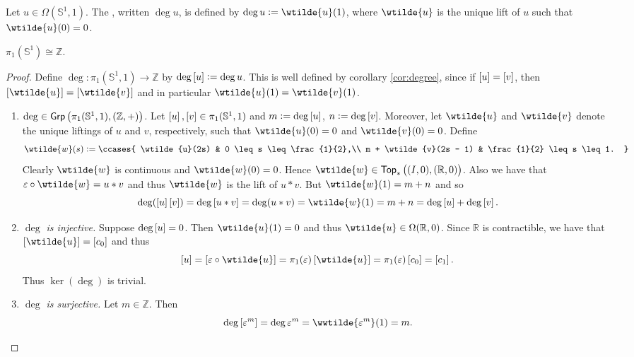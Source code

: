 \begin{definition}[Degree]
	Let $u \in \Omega(\mathbb{S}^1,1)$. The , written $\deg u$, is defined by $\deg u := \wtilde{u}(1)$, where $\wtilde{u}$ is the unique lift of $u$ such that $\wtilde{u}(0) = 0$. 
\end{definition}

\begin{theorem}
	$\pi_1(\mathbb{S}^1) \cong \mathbb{Z}$.
\end{theorem}

\begin{proof}
	Define $\deg : \pi_1(\mathbb{S}^1,1) \to \mathbb{Z}$ by $\deg \sbr{u} := \deg u$. This is well defined by corollary \ref{cor:degree}, since if $\sbr{u} = \sbr{v}$, then $\sbr[0]{\wtilde{u}} = \sbr[0]{\wtilde{v}}$ and in particular $\wtilde{u}(1) = \wtilde{v}(1)$. 
	\begin{enumerate}[label = \textit{Step \arabic*:},wide = 0pt, itemsep = 1.5ex]
		\item \textit{$\deg \in \mathsf{Grp}\del[1]{\pi_1(\mathbb{S}^1,1),(\mathbb{Z},+)}$.} Let $\sbr{u},\sbr{v} \in \pi_1(\mathbb{S}^1,1)$ and $m := \deg\sbr{u}$, $n := \deg \sbr{v}$. Moreover, let $\wtilde{u}$ and $\wtilde{v}$ denote the unique liftings of $u$ and $v$, respectively, such that $\wtilde{u}(0) = 0$ and $\wtilde{v}(0) = 0$. Define
			\begin{equation*}
				\wtilde{w}(s) := \ccases{
				\wtilde{u}(2s) & 0 \leq s \leq \frac{1}{2},\\
				m + \wtilde{v}(2s - 1) & \frac{1}{2} \leq s \leq 1.
			}
			\end{equation*}
		Clearly $\wtilde{w}$ is continuous and $\wtilde{w}(0) = 0$. Hence $\wtilde{w} \in \mathsf{Top}_\ast\del[1]{(I,0),(\mathbb{R},0)}$. Also we have that $\varepsilon \circ \wtilde{w} = u \ast v$ and thus $\wtilde{w}$ is the lift of $u \ast v$. But $\wtilde{w}(1) = m + n$ and so
			\begin{equation*}
				\deg(\sbr{u}\sbr{v}) = \deg\sbr{u\ast v} = \deg (u \ast v) = \wtilde{w}(1) = m + n = \deg\sbr{u} + \deg \sbr{v}.
			\end{equation*}
		\item \textit{$\deg$ is injective.} Suppose $\deg\sbr{u} = 0$. Then $\wtilde{u}(1) = 0$ and thus $\wtilde{u} \in \Omega(\mathbb{R},0)$. Since $\mathbb{R}$ is contractible, we have that $\sbr[0]{\wtilde{u}} = \sbr{c_0}$ and thus
			\begin{equation*}
				\sbr{u} = \sbr[0]{\varepsilon \circ \wtilde{u}} = \pi_1(\varepsilon)\sbr[0]{\wtilde{u}} = \pi_1(\varepsilon)\sbr{c_0} = \sbr{c_1}.
			\end{equation*}
			Thus $\ker(\deg)$ is trivial.
		\item \textit{$\deg$ is surjective.} Let $m \in \mathbb{Z}$. Then
			\begin{equation*}
				\deg\sbr[0]{\varepsilon^m} = \deg \varepsilon^m = \wwtilde{\varepsilon^m}(1) = m.
			\end{equation*}
	\end{enumerate}
\end{proof}

